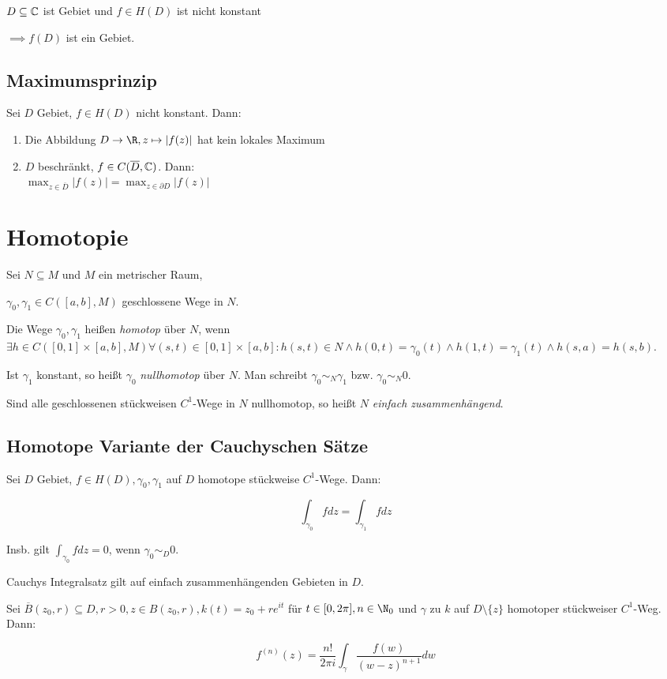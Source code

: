 $D \subseteq \mathbb{C}$ ist Gebiet und $f \in H(D)$ ist nicht konstant

$\implies f(D)$ ist ein Gebiet.

\subsection*{Maximumsprinzip}

Sei $D$ Gebiet, $f \in H(D)$ nicht konstant. Dann:

\begin{enumerate}[label=(\alph*)]
	\item Die Abbildung $D \to \R, z \mapsto |f(z)|$ hat kein lokales Maximum
	\item $D$ beschränkt, $f \in C(\overline D,\mathbb{C})$. Dann: \\ $\max_{z \in \overline D} |f(z)| = \max_{z \in \partial D} |f(z)|$
\end{enumerate}

\section*{Homotopie}

Sei $N \subseteq M$ und $M$ ein metrischer Raum,

$\gamma_0, \gamma_1 \in C([a,b],M)$ geschlossene Wege in $N$.

\vspace*{1mm}

Die Wege $\gamma_0, \gamma_1$ heißen \emph{homotop} über $N$, wenn $\exists h \in C([0,1] \times [a,b],M) \forall (s,t) \in [0,1] \times [a,b] : h(s,t) \in N \land h(0,t)=\gamma_0(t) \land h(1,t) = \gamma_1(t) \land h(s,a) = h(s,b)$.

\vspace*{1mm}

Ist $\gamma_1$ konstant, so heißt $\gamma_0$ \emph{nullhomotop} über $N$. Man schreibt $\gamma_0 \sim_N \gamma_1$ bzw. $\gamma_0 \sim_N 0$.

\vspace*{1mm}

Sind alle geschlossenen stückweisen $C^1$-Wege in $N$ nullhomotop, so heißt $N$ \emph{einfach zusammenhängend}.

\subsection*{Homotope Variante der Cauchyschen Sätze}

Sei $D$ Gebiet, $f \in H(D), \gamma_0, \gamma_1$ auf $D$ homotope stückweise $C^1$-Wege. Dann:

$$\int_{\gamma_0} f dz = \int_{\gamma_1} f dz$$

Insb. gilt $\int_{\gamma_0} f dz = 0$, wenn $\gamma_0 \sim_D 0$.

Cauchys Integralsatz gilt auf einfach zusammenhängenden Gebieten in $D$.

\spacing

Sei $\overline B(z_0,r) \subseteq D, r > 0, z \in B(z_0,r), k(t) = z_0 + re^{it}$ für $t \in [0, 2\pi], n \in \N_0$ und $\gamma$ zu $k$ auf $D \setminus \{z\}$ homotoper stückweiser $C^1$-Weg. Dann:

$$f^{(n)}(z) = \frac{n!}{2\pi i} \int_\gamma \frac{f(w)}{(w-z)^{n+1}} dw$$
